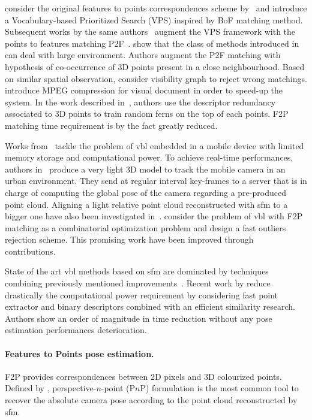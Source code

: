 \citet{Sattler2011} consider the original features to points correspondences scheme by~\citep{Irschara2009} and introduce a Vocabulary-based Prioritized Search (VPS) inspired by BoF matching method. Subsequent works by the same authors~\citep{Sattler2012} augment the VPS framework with the points to features matching P2F~\citep{Li2010}. \citet{Li2012} show that the class of methods introduced in~\citep{Irschara2009,Li2010} can deal with large environment. Authors augment the P2F matching with hypothesis of co-occurrence of 3D points present in a close neighbourhood. Based on similar spatial observation, \citet{Sattler2015} consider visibility graph to reject wrong matchings. \citet{Heisterklaus2014} introduce MPEG compression for visual document in order to speed-up the system. In the work described in~\citep{Donoser2014}, authors use the descriptor redundancy associated to 3D points to train random ferns on the top of each points. F2P matching time requirement is by the fact greatly reduced. 

Works from~\citep{Middelberg2014,Lynen2015} tackle the problem of \ac{vbl} embedded in a mobile device with limited memory storage and computational power. To achieve real-time performances, authors in~\citep{Middelberg2014} produce a very light 3D model to track the mobile camera in an urban environment. They send at regular interval key-frames to a server that is in charge of computing the global pose of the camera regarding a pre-produced point cloud. Aligning a light relative point cloud reconstructed with \ac{sfm} to a bigger one have also been investigated in~\citep{Lu2015}. \citet{Svarm2014} consider the problem of \ac{vbl} with F2P matching as a combinatorial optimization problem and design a fast outliers rejection scheme. This promising work have been improved through~\citep{Zeisl2015,Svarm2016} contributions.

State of the art \ac{vbl} methods based on \ac{sfm} are dominated by techniques combining previously mentioned improvements~\citep{Sattler2016a}. Recent work by \citet{Feng2016a} reduce drastically the computational power requirement by considering fast point extractor and binary descriptors combined with an efficient similarity research. Authors show an order of magnitude in time reduction without any pose estimation performances deterioration.

\paragraph{Features to Points pose estimation.}
F2P provides correspondences between 2D pixels and 3D colourized points. Defined by \citet{Hartley2003}, perspective-$n$-point (P$n$P) formulation is the most common tool to recover the absolute camera pose according to the point cloud reconstructed by \ac{sfm}.

